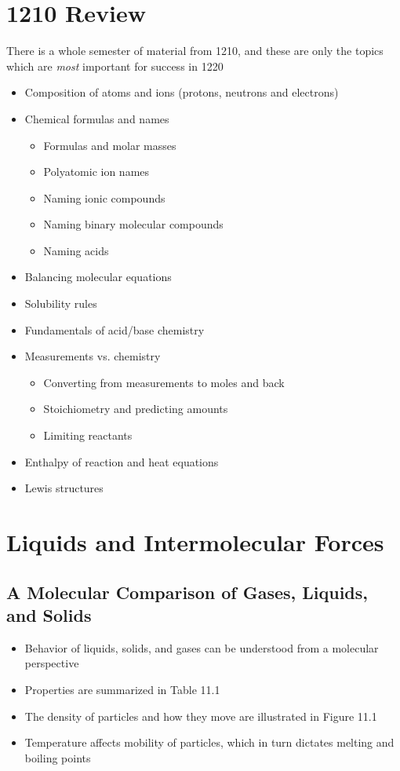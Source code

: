 \documentclass[12pt, openany, letterpaper]{memoir}
\begin{document}
\setcounter{chapter}{-1}
\chapter{1210 Review}

There is a whole semester of material from 1210, and these are only the topics which are \emph{most} important for success in 1220

\begin{itemize}
	\item Composition of atoms and ions (protons, neutrons and electrons)
	\item Chemical formulas and names
	\begin{itemize}
		\item Formulas and molar masses
		\item Polyatomic ion names
		\item Naming ionic compounds
		\item Naming binary molecular compounds
		\item Naming acids
	\end{itemize}
	\item Balancing molecular equations
	\item Solubility rules
	\item Fundamentals of acid/base chemistry
	\item Measurements vs. chemistry
	\begin{itemize}
		\item Converting from measurements to moles and back
		\item Stoichiometry and predicting amounts
		\item Limiting reactants
	\end{itemize}
	\item Enthalpy of reaction and heat equations
	\item Lewis structures
\end{itemize}

\setcounter{chapter}{10}
\chapter{Liquids and Intermolecular Forces}
\section{A Molecular Comparison of Gases, Liquids, and Solids}
\begin{itemize}
  \item Behavior of liquids, solids, and gases can be understood from a molecular perspective
  \item Properties are summarized in Table 11.1
  \item The density of particles and how they move are illustrated in Figure 11.1
  \item Temperature affects mobility of particles, which in turn dictates melting and boiling points
\end{itemize}
\end{document}
